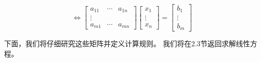 \begin{equation}
\Longleftrightarrow 
\begin{bmatrix} a_{11} & \cdots & a_{1n} \\ \vdots \\ a_{m1} & \cdots & a_{mn} \end{bmatrix} 
\begin{bmatrix} x_1 \\ \vdots \\ x_n \end{bmatrix} = 
\begin{bmatrix} b_1 \\ \vdots \\ b_m \end{bmatrix}
\tag{2.10}\label{eq:2-10}
\end{equation}

下面，我们将仔细研究这些矩阵并定义计算规则。 我们将在2.3节返回求解线性方程。
